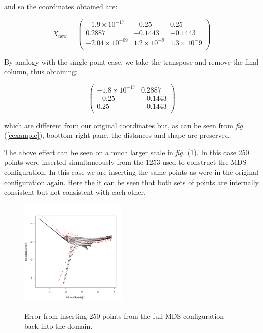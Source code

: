 \documentclass[a4paper,10pt]{amsart}
\newcommand{\fig}[1]{\emph{fig.} (\ref{#1})}
\newcommand{\cross}{\times}
\begin{document}
and so the coordinates obtained are:

\begin{equation*}
\tilde{X}_\text{new}=\begin{pmatrix}
-1.9\cross 10^{-17} & -0.25 & 0.25\\
 0.2887 & -0.1443 & -0.1443\\
-2.04\cross 10^{-09} &  1.2\cross 10^{-9} & 1.3\cross 10^-{9}\\
\end{pmatrix}
\end{equation*}

By analogy with the single point case, we take the transpose and remove the final column, thus obtaining:

\begin{equation*}
\begin{pmatrix}
-1.8\cross 10^{-17} &  0.2887\\
-0.25 & -0.1443\\
 0.25 & -0.1443\\
\end{pmatrix}
\end{equation*}

which are different from our original coordinates but, as can be seen from \fig{cexample}, boottom right pane, the distances and shape are preserved.


The above effect can be seen on a much larger scale in \fig{gowerfullinsert}. In this case 250 points were inserted simultaneously from the 1253 used to construct the MDS configuration. In this case we are inserting the same points as were in the original configuration again. Here the it can be seen that both sets of points are internally consistent but not consistent with each other.

\begin{figure}
\centering
\includegraphics[width=2in]{figs/wt2-gowererr-fullover.pdf} \\
\caption{Error from inserting 250 points from the full MDS configuration back into the domain.}
\label{gowerfullinsert}
\end{figure}
\end{document}
